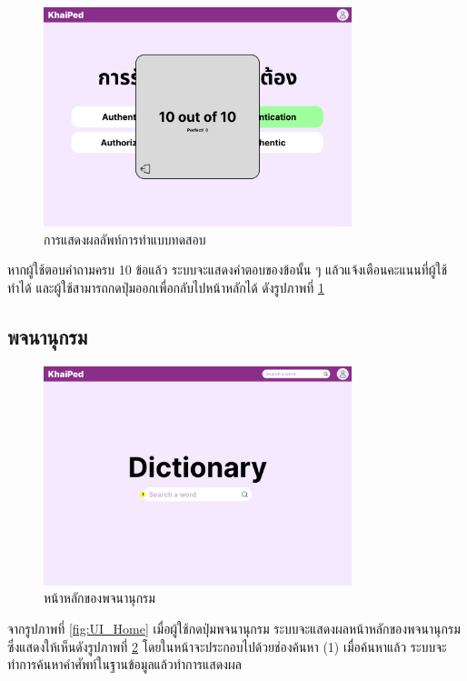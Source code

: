 \documentclass[12pt,oneside,openright,a4paper]{cpe-thai-project}
\begin{document}
\pagebreak
\begin{figure}[!h]\centering
	\includegraphics[width=0.8\textwidth, keepaspectratio=true]{image/chap3/ui/quiz/Quiz - Result.png}
	\caption{การแสดงผลลัพท์การทำแบบทดสอบ}\label{fig:UI_QuizResult}
\end{figure}
\hspace{1cm}
หากผู้ใช้ตอบคำถามครบ 10 ข้อแล้ว ระบบจะแสดงคำตอบของข้อนั้น ๆ แล้วแจ้งเตือนคะแนนที่ผู้ใช้ทำได้ และผู้ใช้สามารถกดปุ่มออกเพื่อกลับไปหน้าหลักได้ ดังรูปภาพที่ \ref{fig:UI_QuizResult}

\subsection{พจนานุกรม}
\begin{figure}[!h]\centering
	\includegraphics[width=0.8\textwidth, keepaspectratio=true]{image/chap3/ui/dict/Dictionary.png}
	\caption{หน้าหลักของพจนานุกรม}\label{fig:UI_Dictionary}
\end{figure}
\hspace{1cm}
จากรูปภาพที่ \ref{fig:UI_Home} เมื่อผู้ใช้กดปุ่มพจนานุกรม ระบบจะแสดงผลหน้าหลักของพจนานุกรม ซึ่งแสดงให้เห็นดังรูปภาพที่ \ref{fig:UI_Dictionary} 
โดยในหน้าจะประกอบไปด้วยช่องค้นหา (1) เมื่อค้นหาแล้ว ระบบจะทำการค้นหาคำศัพท์ในฐานข้อมูลแล้วทำการแสดงผล
\end{document}
